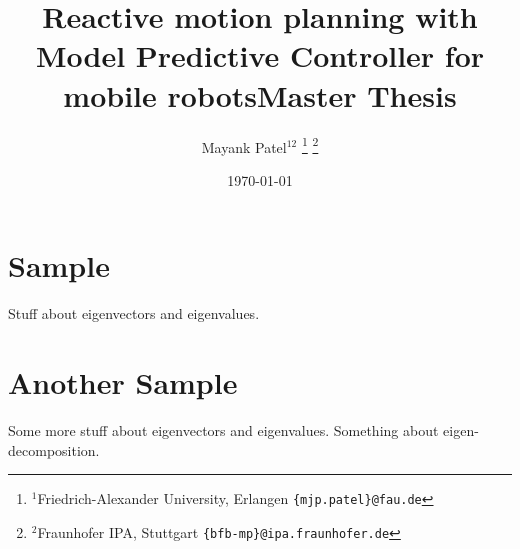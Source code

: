 \documentclass[english,paper=a5,headsepline=true,9pt,DIV=12,BCOR=0.7cm]{scrbook}
\title{Reactive motion planning with Model Predictive Controller for mobile robots}
\author{Mayank Patel$^{12}$%
\thanks{$^{1}$Friedrich-Alexander University, Erlangen
	{\tt\small \{mjp.patel\}@fau.de}}
\thanks{$^{2}$Fraunhofer IPA, Stuttgart
	{\tt\small \{bfb-mp\}@ipa.fraunhofer.de}}
}
\title{Master Thesis} %
\author{\authorstring}
\date{\today} %
\theoremstyle{definition}
\numberwithin{equation}{section}	%
\numberwithin{figure}{section}		%
\numberwithin{table}{section}	%
\begin{document}
 
\maketitle
\chapter{Sample} 

Stuff about eigenvectors and 
eigenvalues. 

\chapter{Another Sample} 

Some more stuff about eigenvectors and 
eigenvalues. Something about 
eigen-decomposition. 
\end{document}
